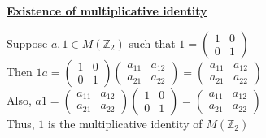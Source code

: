 \documentclass{article} %
\begin{document}
\begin{addmargin}[1em]{0em}
\underline{\textbf{Existence of multiplicative identity}}
\begin{addmargin}[1em]{0em}
Suppose $a, 1 \in M(\mathbb{Z}_2)$ such that $1 = \left(\begin{smallmatrix} 1 & 0 \\ 0 & 1 \end{smallmatrix}\right)$
\\Then $1a =  \left(\begin{smallmatrix} 1 & 0 \\ 0 & 1 \end{smallmatrix}\right)  \left(\begin{smallmatrix} a_{11} & a_{12} \\ a_{21} & a_{22} \end{smallmatrix}\right) = \left(\begin{smallmatrix} a_{11} & a_{12} \\ a_{21} & a_{22} \end{smallmatrix}\right)$
\\Also, $a1 = \left(\begin{smallmatrix} a_{11} & a_{12} \\ a_{21} & a_{22} \end{smallmatrix}\right) \left(\begin{smallmatrix} 1 & 0 \\ 0 & 1 \end{smallmatrix}\right)  = \left(\begin{smallmatrix} a_{11} & a_{12} \\ a_{21} & a_{22} \end{smallmatrix}\right)$
\\Thus, $1$ is the multiplicative identity of $M(\mathbb{Z}_2)$
\end{addmargin}





\end{addmargin}

\newpage
\end{document}
